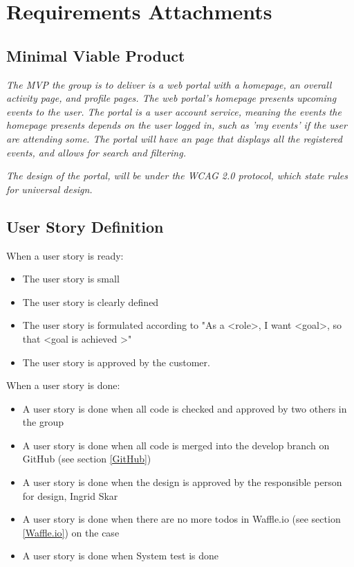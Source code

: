 \chapter{Requirements Attachments}

\section{Minimal Viable Product}
\label{original_minimal_viable_product}
\textit{ The MVP the group is to deliver is a web portal with a homepage, an overall activity page, and profile pages. The web portal's homepage presents upcoming events to the user. The portal is a user account service, meaning the events the homepage presents depends on the user logged in, such as 'my events' if the user are attending some. The portal will have an page that displays all the registered events, and allows for search and filtering. }

\textit{The design of the portal, will be under the WCAG 2.0 protocol, which state rules for universal design.}


\section{User Story Definition}
\label{user_story_definition}
\begin{description}
    \item[When a user story is ready:]
\end{description}
\begin{itemize}[noitemsep]
    \item The user story is small
    \item The user story is clearly defined
    \item The user story is formulated according to "As a \textless role\textgreater, I want \textless goal\textgreater, so that \textless goal is achieved \textgreater"
    \item The user story is approved by the customer.
\end{itemize}

\begin{description}
    \item[When a user story is done:]
\end{description}
\begin{itemize}[noitemsep]
    \item A user story is done when all code is checked and approved by two others in the group
    \item A user story is done when all code is merged into the develop branch on GitHub (see section \ref{GitHub})
    \item A user story is done when the design is approved by the responsible person for design, Ingrid Skar 
    \item A user story is done when there are no more todos in Waffle.io (see section \ref{Waffle.io}) on the case
    \item A user story is done when System test is done
\end{itemize}

